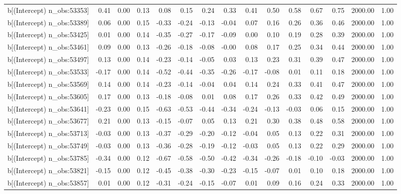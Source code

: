 \begin{table}[ht]
\begin{tabular}{rrrrrrrrrrrrrrr}
  b[(Intercept) n\_obs:53353] & 0.41 & 0.00 & 0.13 & 0.08 & 0.15 & 0.24 & 0.33 & 0.41 & 0.50 & 0.58 & 0.67 & 0.75 & 2000.00 & 1.00 \\ 
  b[(Intercept) n\_obs:53389] & 0.06 & 0.00 & 0.15 & -0.33 & -0.24 & -0.13 & -0.04 & 0.07 & 0.16 & 0.26 & 0.36 & 0.46 & 2000.00 & 1.00 \\ 
  b[(Intercept) n\_obs:53425] & 0.01 & 0.00 & 0.14 & -0.35 & -0.27 & -0.17 & -0.09 & 0.00 & 0.10 & 0.19 & 0.28 & 0.39 & 2000.00 & 1.00 \\ 
  b[(Intercept) n\_obs:53461] & 0.09 & 0.00 & 0.13 & -0.26 & -0.18 & -0.08 & -0.00 & 0.08 & 0.17 & 0.25 & 0.34 & 0.44 & 2000.00 & 1.00 \\ 
  b[(Intercept) n\_obs:53497] & 0.13 & 0.00 & 0.14 & -0.23 & -0.14 & -0.05 & 0.03 & 0.13 & 0.23 & 0.31 & 0.39 & 0.47 & 2000.00 & 1.00 \\ 
  b[(Intercept) n\_obs:53533] & -0.17 & 0.00 & 0.14 & -0.52 & -0.44 & -0.35 & -0.26 & -0.17 & -0.08 & 0.01 & 0.11 & 0.18 & 2000.00 & 1.00 \\ 
  b[(Intercept) n\_obs:53569] & 0.14 & 0.00 & 0.14 & -0.23 & -0.14 & -0.04 & 0.04 & 0.14 & 0.24 & 0.33 & 0.41 & 0.47 & 2000.00 & 1.00 \\ 
  b[(Intercept) n\_obs:53605] & 0.17 & 0.00 & 0.13 & -0.18 & -0.08 & 0.01 & 0.08 & 0.17 & 0.26 & 0.33 & 0.42 & 0.49 & 2000.00 & 1.00 \\ 
  b[(Intercept) n\_obs:53641] & -0.23 & 0.00 & 0.15 & -0.63 & -0.53 & -0.44 & -0.34 & -0.24 & -0.13 & -0.03 & 0.06 & 0.15 & 2000.00 & 1.00 \\ 
  b[(Intercept) n\_obs:53677] & 0.21 & 0.00 & 0.13 & -0.15 & -0.07 & 0.05 & 0.13 & 0.21 & 0.30 & 0.38 & 0.48 & 0.58 & 2000.00 & 1.00 \\ 
  b[(Intercept) n\_obs:53713] & -0.03 & 0.00 & 0.13 & -0.37 & -0.29 & -0.20 & -0.12 & -0.04 & 0.05 & 0.13 & 0.22 & 0.31 & 2000.00 & 1.00 \\ 
  b[(Intercept) n\_obs:53749] & -0.03 & 0.00 & 0.13 & -0.36 & -0.28 & -0.19 & -0.12 & -0.03 & 0.05 & 0.13 & 0.22 & 0.29 & 2000.00 & 1.00 \\ 
  b[(Intercept) n\_obs:53785] & -0.34 & 0.00 & 0.12 & -0.67 & -0.58 & -0.50 & -0.42 & -0.34 & -0.26 & -0.18 & -0.10 & -0.03 & 2000.00 & 1.00 \\ 
  b[(Intercept) n\_obs:53821] & -0.15 & 0.00 & 0.12 & -0.45 & -0.38 & -0.30 & -0.23 & -0.15 & -0.07 & 0.01 & 0.10 & 0.18 & 2000.00 & 1.00 \\ 
  b[(Intercept) n\_obs:53857] & 0.01 & 0.00 & 0.12 & -0.31 & -0.24 & -0.15 & -0.07 & 0.01 & 0.09 & 0.16 & 0.24 & 0.33 & 2000.00 & 1.00 \\ 

\end{tabular}
\end{table}
